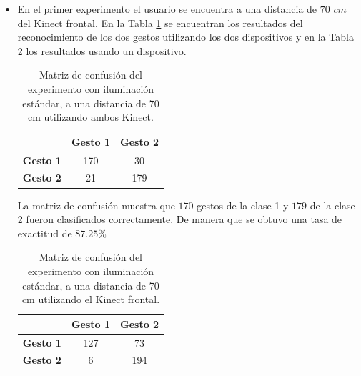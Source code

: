 \begin{itemize}

\item En el primer experimento el usuario se encuentra a una distancia de $70$ $cm$ del Kinect frontal. En la Tabla \ref{table:70L2K} se encuentran los resultados del reconocimiento de los dos gestos utilizando los dos dispositivos y en la Tabla \ref{table:70L1K} los resultados usando un dispositivo.  


\begin{table}[h!] 
\begin{center} 
\caption{Matriz de confusión del experimento con iluminación estándar, a una distancia de 70 cm utilizando ambos Kinect.} 
\label{table:70L2K} 
\renewcommand{\arraystretch}{1.2}
\begin{tabular}{ r || c  c }  
        & \textbf{Gesto 1} & \textbf{Gesto 2} \\ \hline \hline  
\textbf{Gesto 1} & 170  &  30  \\ \hline  
\textbf{Gesto 2} & 21   & 179 \\   
\end{tabular}
\end{center} 
\end{table}

La matriz de confusión muestra que $170$ gestos de la clase 1 y $179$ de la clase 2 fueron clasificados correctamente. De manera que se obtuvo una tasa de exactitud de $87.25 \%$  

\begin{table}[h!] 
\begin{center}
\caption{Matriz de confusión del experimento con iluminación estándar, a una distancia de 70 cm utilizando el Kinect frontal.}
\label{table:70L1K} 
\renewcommand{\arraystretch}{1.2}
\begin{tabular}{ r || c  c } 
        & \textbf{Gesto 1} & \textbf{Gesto 2} \\ \hline \hline  
\textbf{Gesto 1} & 127  &  73  \\ \hline  
\textbf{Gesto 2} & 6    &  194 \\   
\end{tabular}
\end{center} 
\end{table}


\end{itemize}
